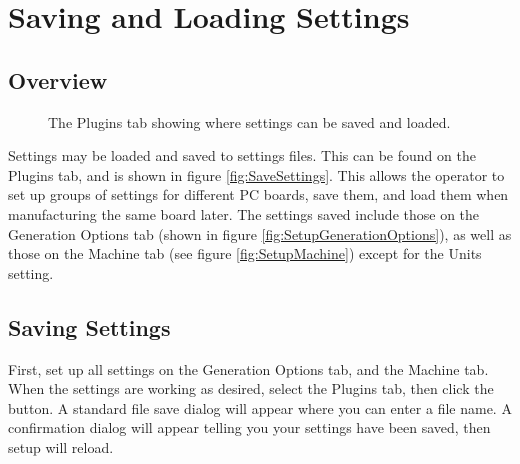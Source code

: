 \documentclass[11pt]{book}
\begin{document}
%
%
\section{Saving and Loading Settings}\label{sec:SaveSettings}

\subsection{Overview}

\begin{figure}
	\caption{The Plugins tab showing where settings can be saved and loaded.}
	\label{fig:SaveSettings}
\end{figure}

Settings may be loaded and saved to settings files. This can be found on the Plugins tab, and is shown in figure \vref{fig:SaveSettings}. This allows the operator to set up groups of settings for different PC boards, save them, and load them when manufacturing the same board later. The settings saved include those on the Generation Options tab (shown in figure \vref{fig:SetupGenerationOptions}), as well as those on the Machine tab (see figure \vref{fig:SetupMachine}) except for the Units setting.

\subsection{Saving Settings}

First, set up all settings on the Generation Options tab, and the Machine tab. When the settings are working as desired, select the Plugins tab, then click the  button. A standard file save dialog will appear where you can enter a file name. A confirmation dialog will appear telling you your settings have been saved, then setup will reload.
\end{document}
